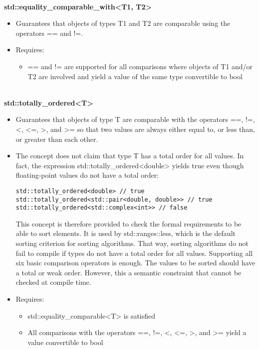 \noindent
\hspace*{\fill} \\ %
\textbf{std::equality\_comparable\_with<T1, T2>}

\begin{itemize}
\item
Guarantees that objects of types T1 and T2 are comparable using the operators == and !=.

\item
Requires:
\begin{itemize}
\item
== and != are supported for all comparisons where objects of T1 and/or T2 are involved and yield a value of the same type convertible to bool
\end{itemize}
\end{itemize}



\noindent
\hspace*{\fill} \\ %
\textbf{std::totally\_ordered<T>}

\begin{itemize}
\item
Guarantees that objects of type T are comparable with the operators ==, !=, <, <=, >, and >= so that two values are always either equal to, or less than, or greater than each other.

\item
The concept does not claim that type T has a total order for all values. In fact, the expression std::totally\_ordered<double> yields true even though floating-point values do not have a total order:

\begin{lstlisting}[style=styleCXX]
std::totally_ordered<double> // true
std::totally_ordered<std::pair<double, double>> // true
std::totally_ordered<std::complex<int>> // false
\end{lstlisting}

This concept is therefore provided to check the formal requirements to be able to sort elements. It is used by std::ranges::less, which is the default sorting criterion for sorting algorithms. That way, sorting algorithms do not fail to compile if types do not have a total order for all values. Supporting all six basic comparison operators is enough. The values to be sorted should have a total or weak order. However, this a semantic constraint that cannot be checked at compile time.

\item
Requires:
\begin{itemize}
\item
std::equality\_comparable<T> is satisfied

\item
All comparisons with the operators ==, !=, <, <=, >, and >= yield a value convertible to bool
\end{itemize}
\end{itemize}

